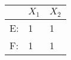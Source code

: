 \begin{tabular}{|l|l|l|}\hline
     &$X_1$ &$X_2$ \\\hline
E:   &1 &1	\\\hline
F:   &1 &1	\\\hline
\end{tabular}
